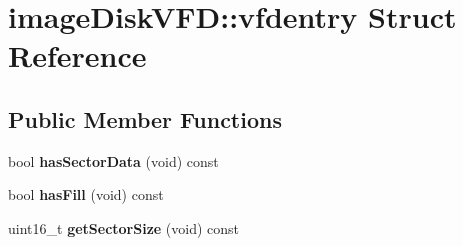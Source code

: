 \hypertarget{structimageDiskVFD_1_1vfdentry}{\section{image\-Disk\-V\-F\-D\-:\-:vfdentry Struct Reference}
\label{structimageDiskVFD_1_1vfdentry}
}
\subsection*{Public Member Functions}
\begin{DoxyCompactItemize}
\item 
\hypertarget{structimageDiskVFD_1_1vfdentry_a1b7549dd4a8b0dcaa57eebdbec79f6a0}{bool {\bfseries has\-Sector\-Data} (void) const }\label{structimageDiskVFD_1_1vfdentry_a1b7549dd4a8b0dcaa57eebdbec79f6a0}

\item 
\hypertarget{structimageDiskVFD_1_1vfdentry_a3d42ff868a2de629a44f663492ecd184}{bool {\bfseries has\-Fill} (void) const }\label{structimageDiskVFD_1_1vfdentry_a3d42ff868a2de629a44f663492ecd184}

\item 
\hypertarget{structimageDiskVFD_1_1vfdentry_a0f1aa26605501815c28d81e62395c93d}{uint16\-\_\-t {\bfseries get\-Sector\-Size} (void) const }\label{structimageDiskVFD_1_1vfdentry_a0f1aa26605501815c28d81e62395c93d}

\end{DoxyCompactItemize}
